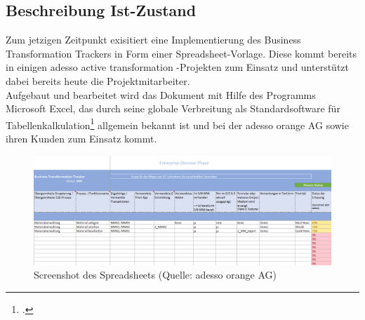 \subsection{Beschreibung Ist-Zustand}
Zum jetzigen Zeitpunkt exisitiert eine Implementierung des Business Transformation Trackers in Form einer Spreadsheet-Vorlage. Diese kommt bereits in einigen adesso active transformation -Projekten zum Einsatz und unterstützt dabei bereits heute die Projektmitarbeiter.\\ Aufgebaut und bearbeitet wird das Dokument mit Hilfe des Programms Microsoft Excel, das durch seine globale Verbreitung als Standardsoftware für Tabellenkalkulation\footcite[Vgl.][]{wiki-excel} allgemein bekannt ist und bei der adesso orange AG sowie ihren Kunden zum Einsatz kommt.\\
\begin{figure}[h!]
    \centering
    \includegraphics[scale=0.45]{./Bilder/BTT-Ist.png}
    \caption[Istzustand BTT]{Screenshot des Spreadsheets (Quelle: adesso orange AG)}
\end{figure}
